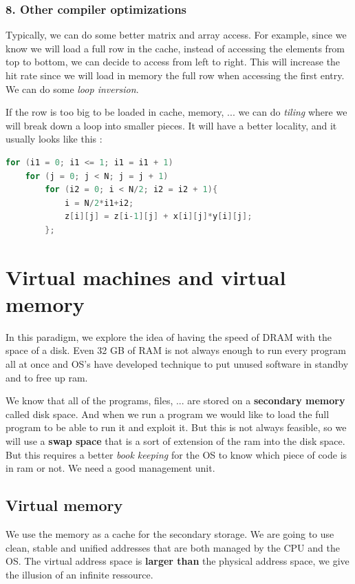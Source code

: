 \documentclass{report}
\begin{document}
\subsubsection{8. Other compiler optimizations}

Typically, we can do some better matrix and array access. For example, since we know we will load a full row in the cache, instead of accessing the elements from top to bottom, we can decide to access from left to right. This will increase the hit rate since we will load in memory the full row when accessing the first entry. We can do some \textit{loop inversion}.

If the row is too big to be loaded in cache, memory, ... we can do \textit{tiling} where we will break down a loop into smaller pieces. It will have a better locality, and it usually looks like this :

\begin{lstlisting}[language=c, caption=Typical tiling]
for (i1 = 0; i1 <= 1; i1 = i1 + 1)
    for (j = 0; j < N; j = j + 1)
        for (i2 = 0; i < N/2; i2 = i2 + 1){
            i = N/2*i1+i2;
            z[i][j] = z[i-1][j] + x[i][j]*y[i][j];
        };
\end{lstlisting}

\section{Virtual machines and virtual memory}

In this paradigm, we explore the idea of having the speed of DRAM with the space of a disk. Even 32 GB of RAM is not always enough to run every program all at once and OS's have developed technique to put unused software in standby and to free up ram.

We know that all of the programs, files, ... are stored on a \textbf{secondary memory} called disk space. And when we run a program we would like to load the full program to be able to run it and exploit it. But this is not always feasible, so we will use a \textbf{swap space} that is a sort of extension of the ram into the disk space. But this requires a better \textit{book keeping} for the OS to know which piece of code is in ram or not. We need a good management unit.

\subsection{Virtual memory}

We use the memory as a cache for the secondary storage. We are going to use clean, stable and unified addresses that are both managed by the CPU and the OS. The virtual address space is \textbf{larger than} the physical address space, we give the illusion of an infinite ressource.
\end{document}
